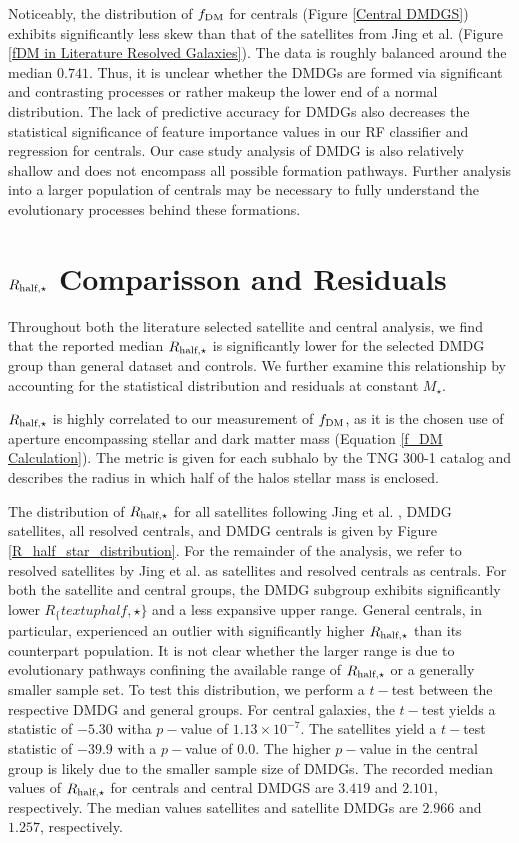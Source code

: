 \documentclass[twocolumn]{openjournal}
\begin{document}
Noticeably, the distribution of $f_\textup{DM}$ for centrals (Figure \ref{Central DMDGS}) exhibits significantly less skew than that of the satellites from Jing et al. (Figure \ref{fDM in Literature Resolved Galaxies}). The data is roughly balanced around the median $0.741$. Thus, it is unclear whether the DMDGs are formed via significant and contrasting processes or rather makeup the lower end of a normal distribution. The lack of predictive accuracy for DMDGs also decreases the statistical significance of feature importance values in our RF classifier and regression for centrals. Our case study analysis of DMDG is also relatively shallow and does not encompass all possible formation pathways. Further analysis into a larger population of centrals may be necessary to fully understand the evolutionary processes behind these formations.

\section{$R_{\textup{half}, \star}$ Comparisson and Residuals}
Throughout both the literature selected satellite and central analysis, we find that the reported median $R_{\textup{half}, \star}$ is significantly lower for the selected DMDG group than general dataset and controls. We further examine this relationship by accounting for the statistical distribution and residuals at constant $M_\star$.

$R_{\textup{half}, \star}$ is highly correlated to our measurement of $f_\textup{DM}$, as it is the chosen use of aperture encompassing stellar and dark matter mass (Equation \ref{f_DM Calculation}). The metric is given for each subhalo by the TNG 300-1 catalog and describes the radius in which half of the halos stellar mass is enclosed.

The distribution of $R_{\textup{half}, \star}$ for all satellites following Jing et al. \cite{Jing_2019}, DMDG satellites, all resolved centrals, and DMDG centrals is given by Figure \ref{R_half_star_distribution}. For the remainder of the analysis, we refer to resolved satellites by Jing et al. as satellites and resolved centrals as centrals. For both the satellite and central groups, the DMDG subgroup exhibits significantly lower $R_\{textup{half}, \star\}$ and a less expansive upper range. General centrals, in particular, experienced an outlier with significantly higher $R_{\textup{half}, \star}$ than its counterpart population. It is not clear whether the larger range is due to evolutionary pathways confining the available range of $R_{\textup{half}, \star}$ or a generally smaller sample set. To test this distribution, we perform a $t-$test between the respective DMDG and general groups. For central galaxies, the $t-$test yields a statistic of $-5.30$ witha $p-$value of $1.13 \times 10^{-7}$. The satellites yield a $t-$test statistic of $-39.9$ with a $p-$value of $0.0$. The higher $p-$value in the central group is likely due to the smaller sample size of DMDGs. The recorded median values of $R_{\textup{half}, \star}$ for centrals and central DMDGS are $3.419$ and $2.101$, respectively. The median values satellites and satellite DMDGs are $2.966$ and $1.257$, respectively. 
\end{document}
